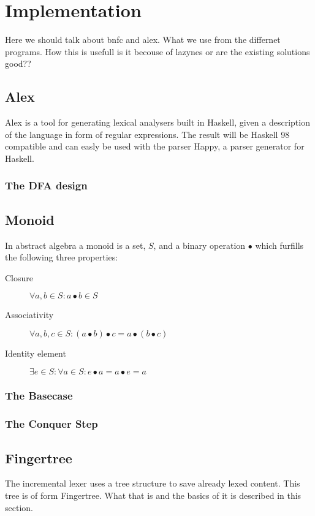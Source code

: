 \chapter{Implementation}
Here we should talk about bnfc and
alex. What we use from the differnet programs. How this is usefull
is it becouse of lazynes or are the existing solutions good??

\section{Alex}
Alex is a tool for generating lexical analysers built in Haskell, given a description of the language
in form of regular expressions. The result will be Haskell 98 compatible and can easly be used with the
parser Happy, a parser generator for Haskell.
\subsection{The DFA design}

\section{Monoid}
In abstract algebra a monoid is a set, $S$, and a binary operation $\bullet$ which furfills the following
three properties:
\begin{description}
\item[Closure] $\forall a,b \in S: a \bullet b \in S$
\item[Associativity] $\forall a,b,c \in S: (a \bullet b) \bullet c = a \bullet (b \bullet c)$
\item[Identity element] $\exists e \in S: \forall a \in S: e \bullet a = a \bullet e = a$
\end{description}

\subsection{The Basecase}
\subsection{The Conquer Step}

\section{Fingertree}
The incremental lexer uses a tree structure to save already lexed content.
This tree is of form Fingertree.
What that is and the basics of it is described in this section.

